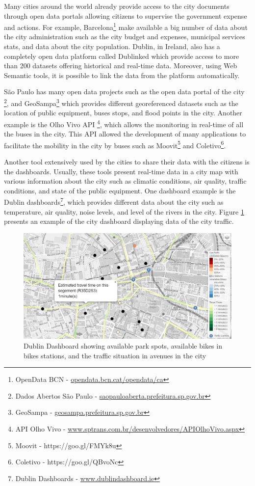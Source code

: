 Many cities around the world already provide access to the city documents through open data portals allowing citizens to supervise the government expense and actions. For example, Barcelona\footnote{OpenData BCN - \url{opendata.bcn.cat/opendata/ca}} make available a big number of data about the city administration such as the city budget and expenses, municipal services stats, and data about the city population. Dublin, in Ireland, also has a completely open data platform called Dublinked \citep{stephenson2012open} which provide access to more than 200 datasets offering historical and real-time data. Moreover, using Web Semantic tools, it is possible to link the data from the platform automatically.

S\~ao Paulo has many open data projects such as the open data portal of the city \footnote{Dados Abertos São Paulo - \url{saopauloaberta.prefeitura.sp.gov.br}}, and GeoSampa\footnote{GeoSampa - \url{geosampa.prefeitura.sp.gov.br}} which provides different georeferenced datasets such as the location of public equipment, buses stops, and flood points in the city. Another example is the Olho Vivo API \footnote{API Olho Vivo - \url{www.sptrans.com.br/desenvolvedores/APIOlhoVivo.aspx}}, which allows the monitoring in real-time of all the buses in the city. This API allowed the development of many applications to facilitate the mobility in the city by buses such as Moovit\footnote{Moovit - https://goo.gl/FMYk8u} and Coletivo\footnote{Coletivo - https://goo.gl/QBvoNc}.

Another tool extensively used by the cities to share their data with the citizens is the dashboards. Usually, these tools present real-time data in a city map with various information about the city such as climatic conditions, air quality, traffic conditions, and state of the public equipment. One dashboard example is the Dublin dashboards\footnote{Dublin Dashboards - \url{www.dublindashboard.ie}}, which provides different data about the city such as temperature, air quality, noise levels, and level of the rivers in the city. Figure \ref{figure:mapaDublin} presents an example of the city dashboard displaying data of the city traffic.

\begin{figure}[!htb]
\centering
\includegraphics[scale=0.5]{figuras/mapaDublin}
\caption{Dublin Dashboard showing available park spots, available bikes in bikes stations, and the traffic situation in avenues in the city}
\label{figure:mapaDublin}
\end{figure}

